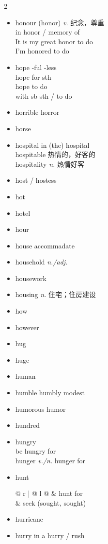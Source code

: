 \documentclass[../../book.tex]{subfiles}
\begin{document}
\begin{multicols}{2}
\begin{itemize}
\item[-] honour (honor) \emph{v.} 纪念，尊重
\\in honor / memory of
\\It is my great honor to do
\\I\textquoteright m honored to do
\item[-] hope \phantom{a} -ful -less
\\hope for sth
\\hope to do
\\with sb sth / to do
\item[-] horrible \phantom{a} horror
\item[-] horse
\item[-] hospital \phantom{a} in (the) hospital
\\{\color{violet}hospitable 热情的，好客的\\hospitality \emph{n.} 热情好客}
\item[-] host / hostess
\item[-] hot
\item[-] hotel
\item[-] hour
\item[-] house \phantom{a} accommadate
\item[-] household \emph{n./adj.}
\item[-] housework
\item[-] housing \emph{n.} 住宅；住房建设
\item[-] how
\item[-] however
\item[-] hug
\item[-] huge
\item[-] human
\item[-] humble \phantom{a} humbly \phantom{a} modest
\item[-] humorous \phantom{a} humor
\item[-] hundred
\item[-] hungry
\\be hungry for
\\hunger \emph{v./n.} hunger for
\item[-] hunt \begin{tabular}{@{} r | @{\hspace{0.1em}} l @{}}
 & hunt \phantom{a} for
\\& seek (sought, sought)
\end{tabular}
\item[-] hurricane
\item[-] hurry \phantom{a} in a hurry / rush

\end{itemize}
\end{multicols}
\end{document}
